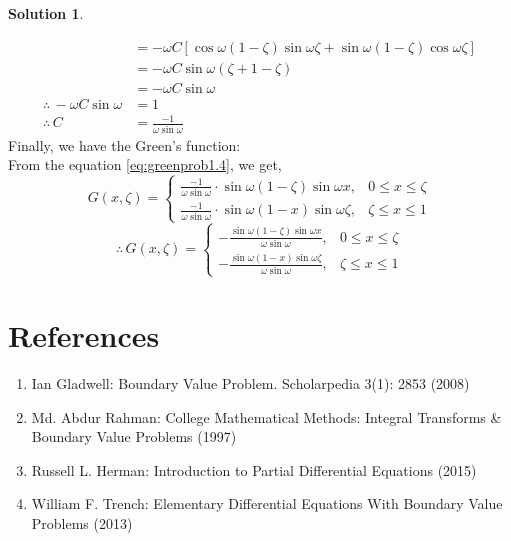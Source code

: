 \documentclass[12pt,a4paper]{article}
\theoremstyle{remark}
\theoremstyle{definition}
\newtheorem*{soln}{Solution}
\begin{document}
\begin{soln}
\begin{enumerate}
\begin{align*}
                                                     & =-\omega C\left[ \cos\omega(1-\zeta)\sin\omega\zeta+\sin\omega(1-\zeta)\cos\omega\zeta \right]                                      \\
                                                     & =-\omega C \sin\omega(\zeta+1-\zeta)                                                                                                \\
                                                     & =-\omega C \sin\omega                                                                                                               \\
                  \therefore \, -\omega C \sin\omega & =1                                                                                                                                  \\
                  \therefore \, C                    & =\frac{-1}{\omega \sin\omega}
              \end{align*}
              Finally, we have the Green's function:\\
              From the equation \eqref{eq:greenprob1.4}, we get,
              \[
                  G(x,\zeta)=\begin{cases}
                      \displaystyle\frac{-1}{\omega \sin\omega} \cdot\sin\omega(1-\zeta)\sin\omega x, & 0\leq x \leq \zeta \\
                      \displaystyle\frac{-1}{\omega \sin\omega}\cdot\sin\omega(1-x)\sin \omega\zeta,  & \zeta\leq x \leq 1
                  \end{cases}
              \]
              \[
                  \therefore\,G(x,\zeta)=\begin{cases}
                      \displaystyle-\frac{\sin\omega(1-\zeta)\sin\omega x}{\omega\sin\omega}, & 0\leq x \leq \zeta \\
                      \displaystyle-\frac{\sin\omega(1-x)\sin\omega \zeta}{\omega\sin\omega}, & \zeta\leq x \leq 1
                  \end{cases}
              \]
    \end{enumerate}
\end{soln}



\newpage
\section{References}
\begin{enumerate}
    \item Ian Gladwell: Boundary Value Problem. Scholarpedia 3(1): 2853 (2008)
    \item Md. Abdur Rahman: College Mathematical Methods: Integral Transforms \& Boundary Value Problems (1997)
    \item Russell L. Herman: Introduction to Partial Differential Equations (2015)
    \item William F. Trench: Elementary Differential Equations With Boundary Value Problems (2013)
\end{enumerate}
\end{document}
